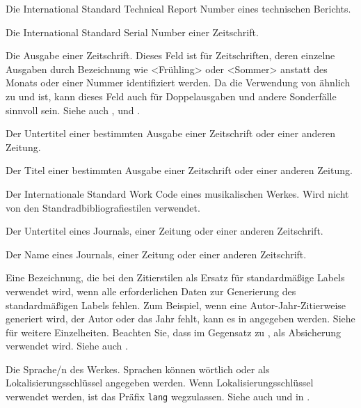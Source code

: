 \documentclass{ltxdockit}[2011/03/25]
\begin{document}
\begin{fieldlist}
Die International Standard Technical Report Number eines technischen Berichts.


Die International Standard Serial Number einer Zeitschrift.


Die Ausgabe einer Zeitschrift. Dieses Feld ist für Zeitschriften, deren einzelne
Ausgaben durch Bezeichnung wie <Frühling> oder <Sommer> anstatt des Monats oder
einer Nummer identifiziert werden. Da die Verwendung von 
ähnlich zu  und  ist, kann dieses Feld auch für
Doppelausgaben und andere Sonderfälle sinnvoll sein. Siehe auch
,  und .


Der Untertitel einer bestimmten Ausgabe einer Zeitschrift oder einer anderen
Zeitung.


Der Titel einer bestimmten Ausgabe einer Zeitschrift oder einer anderen Zeitung.


Der Internationale Standard Work Code eines musikalischen Werkes. Wird  nicht
von den Standradbibliografiestilen  verwendet.


Der Untertitel eines Journals, einer Zeitung oder einer anderen Zeitschrift.


Der Name eines Journals, einer Zeitung oder einer anderen Zeitschrift.


Eine Bezeichnung, die bei den Zitierstilen als Ersatz für standardmäßige Labels
verwendet wird, wenn alle erforderlichen Daten zur Generierung des
standardmäßigen Labels fehlen. Zum Beispiel, wenn eine Autor-Jahr-Zitierweise
generiert wird, der Autor oder das Jahr fehlt, kann es in 
angegeben werden. Siehe  für weitere Einzelheiten. Beachten
Sie, dass im Gegensatz zu ,  als Absicherung
verwendet wird. Siehe auch .


Die Sprache/n des Werkes. Sprachen können wörtlich oder als
Lokalisierungsschlüssel angegeben werden. Wenn Lokalisierungsschlüssel verwendet
werden, ist das Präfix \texttt{lang} wegzulassen. Siehe auch
 und  in .


\end{fieldlist}
\end{document}
